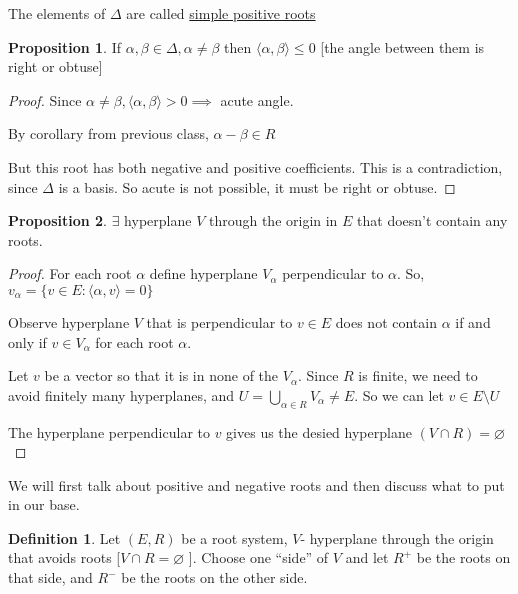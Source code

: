 \documentclass{article}
\theoremstyle{definition}
\newtheorem{definition}{Definition}
\newtheorem{proposition}{Proposition}
\begin{document}
The elements of \(\Delta\) are called \underline{simple positive roots}

\begin{proposition}
    If \(\alpha ,\beta \in \Delta, \alpha \neq \beta\) then \(\langle \alpha ,\beta  \rangle \leq 0\) [the angle between them is right or obtuse] 
\end{proposition}

\begin{proof}
    Since \(\alpha \neq \beta, \langle \alpha ,\beta  \rangle >0 \implies \) acute angle.

    By corollary from previous class, \(\alpha -\beta \in R\) 

    But this root has both negative and positive coefficients. This is a contradiction, since \(\Delta\) is a basis. So acute is not possible, it must be right or obtuse.
\end{proof}

\begin{proposition}
    \(\exists \) hyperplane \(V\) through the origin in \(E\) that doesn't contain any roots.
\end{proposition}

\begin{proof}
    For each root \(\alpha \) define hyperplane \(V_\alpha\) perpendicular to \(\alpha\). So, \(v_\alpha = \{ v\in E : \langle \alpha , v \rangle = 0 \} \) 

    Observe hyperplane \(V\) that is perpendicular to \(v\in E\) does not contain \(\alpha\) if and only if \(v\in V_\alpha\) for each root \(\alpha\).
    
    Let \(v\) be a vector so that it is in none of the \(V_\alpha\). Since \(R\) is finite, we need to avoid finitely many hyperplanes, and \(U=\bigcup_{\alpha \in R}^{} V_\alpha \neq E\). So we can let \(v\in E \setminus U\) 

    The hyperplane perpendicular to \(v\) gives us the desied hyperplane \((V\cap R) = \varnothing\) 
\end{proof}

We will first talk about positive and negative roots and then discuss what to put in our base.

\begin{definition}
    Let \((E,R)\) be a root system, \(V\)- hyperplane through the origin that avoids roots [\(V \cap R = \varnothing \) ]. Choose one ``side'' of \(V\) and let \(R^+\) be the roots on that side, and \(R^-\) be the roots on the other side.
\end{definition}
\end{document}
